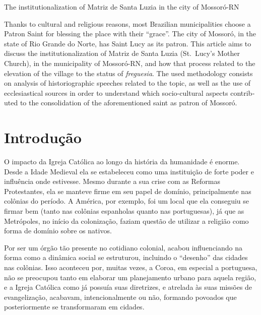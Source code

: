 \begin{refsection}
    
    \begin{otherlanguage}{english}
    
    \fakeChapterOneLine
    {The institutionalization of Matriz de Santa Luzia in the city of Mossoró-RN}

    \begin{galoResumo}[Abstract]
        Thanks to cultural and religious reasons, most Brazilian municipalities choose a Patron Saint for blessing the place with their ``grace''. The city of Mossoró, in the state of Rio Grande do Norte, has Saint Lucy as its patron. This article aims to discuss the institutionalization of Matriz de Santa Luzia (St.~Lucy's Mother Church), in the municipality of Mossoró-RN, and how that process related to the elevation of the village to the status of \textit{freguesia}. The used methodology consists on analysis of historiographic speeches related to the topic, as well as the use of ecclesiastical sources in order to understand which socio-cultural aspects contributed to the consolidation of the aforementioned saint as patron of Mossoró.
    \end{galoResumo}
    
    \end{otherlanguage}

    \section{Introdução}

    O impacto da Igreja Católica ao longo da história da humanidade é enorme. Desde a Idade Medieval ela se estabeleceu como uma instituição de forte poder e influência onde estivesse. Mesmo durante a sua crise com as Reformas Protestantes, ela se manteve firme em seu papel de domínio, principalmente nas colônias do período. A América, por exemplo, foi um local que ela conseguiu se firmar bem (tanto nas colônias espanholas quanto nas portuguesas), já que as Metrópoles, no início da colonização, faziam questão de utilizar a religião como forma de domínio sobre os nativos. 

    Por ser um órgão tão presente no cotidiano colonial, acabou influenciando na forma como a dinâmica social se estruturou, incluindo o ``desenho'' das cidades nas colônias. Isso aconteceu por, muitas vezes, a Coroa, em especial a portuguesa, não se preocupou tanto em elaborar um planejamento urbano para aquela região, e a Igreja Católica como já possuía suas diretrizes, e atrelada às suas missões de evangelização, acabavam, intencionalmente ou não, formando povoados que posteriormente se transformaram em cidades. 


\end{refsection}
